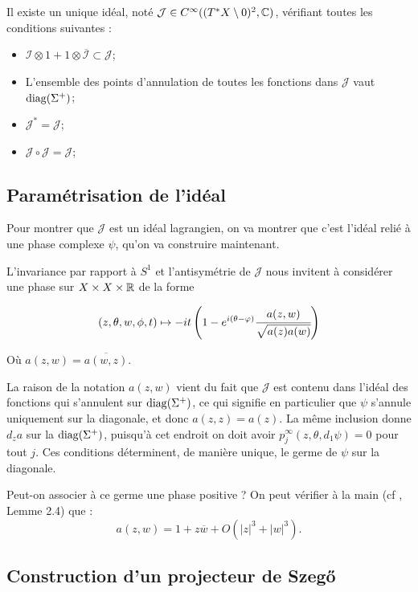 \begin{prop}
	Il existe un unique idéal, noté $\mathcal{J} \in C^{\infty}((T^*X\setminus 0)^2,\mathbb{C})$, vérifiant toutes les conditions suivantes :
	\begin{itemize}
		\item $\mathcal{I}\otimes 1 + 1 \otimes \overline{\mathcal{I}}\subset\mathcal{J}$;
		\item L'ensemble des points d'annulation de toutes les fonctions dans $\mathcal{J}$ vaut $\operatorname{diag}(\Sigma^+)$;
		\item $\mathcal{J}^*=\mathcal{J}$;
		\item $\mathcal{J}\circ\mathcal{J}=\mathcal{J}$;
	\end{itemize}
\end{prop}

\subsection{Paramétrisation de l'idéal}
Pour montrer que $\mathcal{J}$ est un idéal lagrangien, on va montrer que c'est l'idéal relié à une phase complexe $\psi$, qu'on va construire maintenant.

L'invariance par rapport à $S^1$ et l'antisymétrie de $\mathcal{J}$ nous invitent à considérer une phase sur $X \times X \times \mathbb{R}$ de la forme

\begin{equation*}
	(z, \theta ,w, \phi ,t) \mapsto -it\left(1-e^{i(\theta-\varphi)}\cfrac{a(z,w)}{\sqrt{a(z)a(w)}}\right)
\end{equation*}

Où $a(z,w)=\overline{a(w,z)}$.

La raison de la notation $a(z,w)$ vient du fait que $\mathcal{J}$ est contenu dans l'idéal des fonctions qui s'annulent sur $\operatorname{diag}(\Sigma^+)$, ce qui signifie en particulier que $\psi$ s'annule uniquement sur la diagonale, et donc $a(z,z)=a(z)$. La même inclusion donne $d_za$ sur la $\operatorname{diag}(\Sigma^+)$, puisqu'à cet endroit on doit avoir $p^{\infty}_j(z,\theta,d_1\psi)=0$ pour tout $j$. Ces conditions déterminent, de manière unique, le germe de $\psi$ sur la diagonale. 

Peut-on associer à ce germe une phase positive ? On peut vérifier à la main (cf \cite{Shiffman2002}, Lemme 2.4) que :
\begin{equation*}
	a(z,w) = 1 + z\overline{w} + O(|z|^3 + |w|^3).
\end{equation*}

\subsection{Construction d'un projecteur de Szeg\H{o}}


